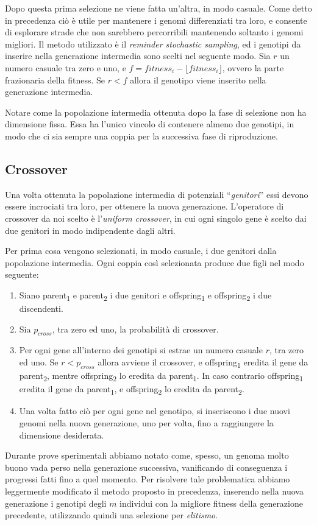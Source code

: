 \documentclass[a4paper,12pt]{article}
\begin{document}
Dopo questa prima selezione ne viene fatta un'altra, in modo casuale. Come detto in precedenza ciò è utile per mantenere i genomi differenziati tra loro, e consente di esplorare strade che non sarebbero percorribili mantenendo soltanto i genomi migliori. Il metodo utilizzato è il \emph{reminder stochastic sampling}, ed i genotipi da inserire nella generazione intermedia sono scelti nel seguente modo. Sia $r$ un numero casuale tra zero e uno, e $f = fitness_i - \lfloor fitness_i \rfloor$, ovvero la parte frazionaria della fitness. Se $r < f$ allora il genotipo viene inserito nella generazione intermedia.

Notare come la popolazione intermedia ottenuta dopo la fase di selezione non ha dimensione fissa. Essa ha l'unico vincolo di contenere almeno due genotipi, in modo che ci sia sempre una coppia per la successiva fase di riproduzione.
\subsection*{Crossover} \label{crossover}
Una volta ottenuta la popolazione intermedia di potenziali ``\emph{genitori}'' essi devono essere incrociati tra loro, per ottenere la nuova generazione. L'operatore di crossover da noi scelto è l'\emph{uniform crossover}, in cui ogni singolo gene è scelto dai due genitori in modo indipendente dagli altri. 

Per prima cosa vengono selezionati, in modo casuale, i due genitori dalla popolazione intermedia. Ogni coppia così selezionata produce due figli nel modo seguente: 
\begin{enumerate}
	\item Siano parent\textsubscript{1} e parent\textsubscript{2} i due genitori e offspring\textsubscript{1} e offspring\textsubscript{2} i due discendenti.
	\item Sia $p_{cross}$, tra zero ed uno, la probabilità di crossover.
	\item Per ogni gene all'interno dei genotipi si estrae un numero casuale $r$, tra zero ed uno. Se $r < p_{cross}$ allora avviene il crossover, e offspring\textsubscript{1} eredita il gene da parent\textsubscript{2}, mentre offspring\textsubscript{2} lo eredita da parent\textsubscript{1}. In caso contrario offspring\textsubscript{1} eredita il gene da parent\textsubscript{1}, e offspring\textsubscript{2} lo eredita da parent\textsubscript{2}.
	\item Una volta fatto ciò per ogni gene nel genotipo, si inseriscono i due nuovi genomi nella nuova generazione, uno per volta, fino a raggiungere la dimensione desiderata. 
\end{enumerate}
Durante prove sperimentali abbiamo notato come, spesso, un genoma molto buono vada perso nella generazione successiva, vanificando di conseguenza i progressi fatti fino a quel momento. Per risolvere tale problematica abbiamo leggermente modificato il metodo proposto in precedenza, inserendo nella nuova generazione i genotipi degli $m$ individui con la migliore fitness della generazione precedente, utilizzando quindi una selezione per \emph{elitismo}.
\end{document}
